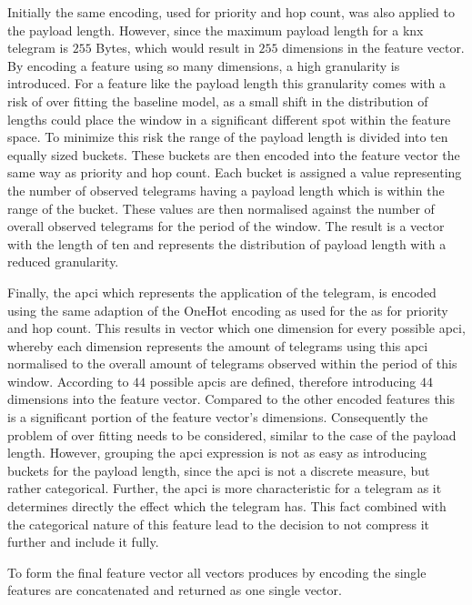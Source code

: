 Initially the same encoding, used for priority and hop count, was also applied to the payload length. However, since the maximum payload length for a \gls{knx} telegram is $255$ Bytes, which would result in $255$ dimensions in the feature vector.
By encoding a feature using so many dimensions, a high granularity is introduced. For a feature like the payload length this granularity comes with a risk of over fitting the baseline model, as a small shift in the distribution of lengths could place the window in a significant different spot within the feature space.
To minimize this risk the range of the payload length is divided into ten equally sized buckets. These buckets are then encoded into the feature vector the same way as priority and hop count.
Each bucket is assigned a value representing the number of observed telegrams having a payload length which is within the range of the bucket. These values are then normalised against the number of overall observed telegrams for the period of the window.
The result is a vector with the length of ten and represents the distribution of payload length with a reduced granularity.

Finally, the \gls{apci} which represents the application of the telegram, is encoded using the same adaption of the OneHot encoding as used for the as for priority and hop count. This results in vector which one dimension for every possible \gls{apci}, whereby each dimension represents the amount of telegrams using this \gls{apci} normalised to the overall amount of telegrams observed within the period of this window.
According to \textcite{DIN_EN_50090-4-1} $44$ possible \glspl{apci} are defined, therefore introducing $44$ dimensions into the feature vector.
Compared to the other encoded features this is a significant portion of the feature vector's dimensions. Consequently the problem of over fitting needs to be considered, similar to the case of the payload length.
However, grouping the \gls{apci} expression is not as easy as introducing buckets for the payload length, since the \gls{apci} is 
not a discrete measure, but rather categorical. Further, the \gls{apci} is more characteristic for a telegram as it determines directly the effect which the telegram has.
This fact combined with the categorical nature of this feature lead to the decision to not compress it further and include it fully.

To form the final feature vector all vectors produces by encoding the single features are concatenated and returned as one single vector.

